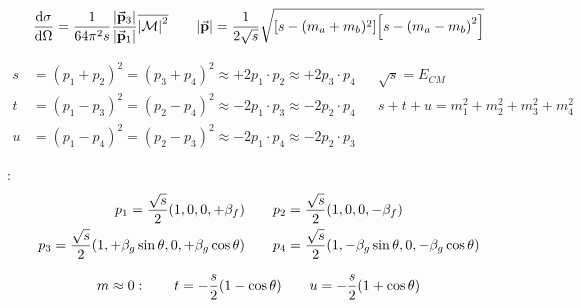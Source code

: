 \begin{equation*}
        \dv{\sigma}{\Omega} = \frac{1}{64\pi^2s}\frac{\abs{\va{p}_{3}}}{\abs{\va{p}_{1}}}\overline{\abs{\operatorname{\mathcal{M}}}^2}
        \qquad
        \abs{\va{p}} = \frac{1}{2\sqrt{s}}\sqrt{\qty[s - (m_a+m_b)^2]\qty[s - \qty(m_a-m_b)^2]}
\end{equation*}

\begin{align*}
        s
        &= (p_1 + p_2)^2 = (p_3 + p_4)^2
        \approx +2p_1\cdot p_2 \approx +2p_3\cdot p_4
        &&
        \sqrt{s} = E_{CM}
        \\
        t
        &= (p_1 - p_3)^2 = (p_2 - p_4)^2
        \approx -2p_1\cdot p_3 \approx -2p_2\cdot p_4
        &&
        s + t + u = m_1^2 + m_2^2 + m_3^2 + m_4^2
        \\
        u
        &= (p_1 - p_4)^2 = (p_2 - p_3)^2
        \approx -2p_1\cdot p_4 \approx -2p_2\cdot p_3
\end{align*}

:
\begin{gather*}
        p_1 = \frac{\sqrt{s}}{2}\qty(1, 0, 0, +\beta_f)
        \qquad
        p_2 = \frac{\sqrt{s}}{2}\qty(1, 0, 0, -\beta_f)
        \\
        p_3 = \frac{\sqrt{s}}{2}\qty(1, +\beta_g\sin\theta, 0, +\beta_g\cos\theta)
        \qquad
        p_4 = \frac{\sqrt{s}}{2}\qty(1, -\beta_g\sin\theta, 0, -\beta_g\cos\theta)
\end{gather*}

\begin{equation*}
        m\approx0
        :\qquad
        t = -\frac{s}{2}\qty(1 - \cos\theta)
        \qquad
        u = -\frac{s}{2}\qty(1 + \cos\theta)
\end{equation*}
